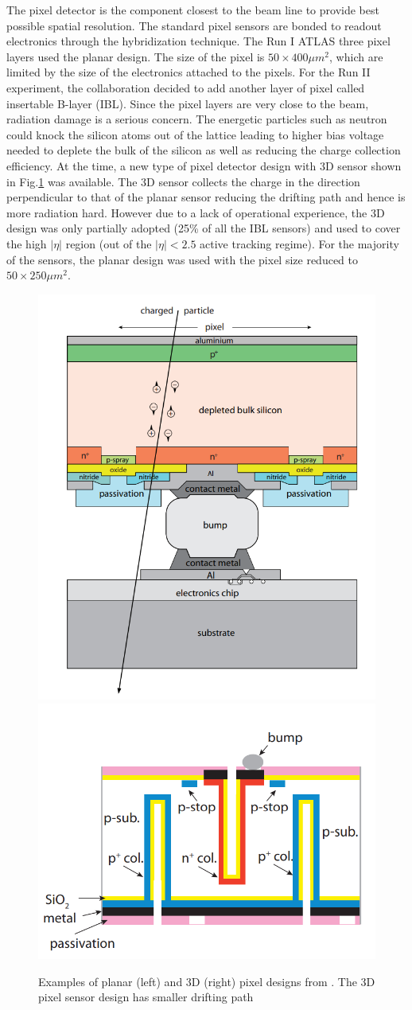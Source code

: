 The pixel detector is the component closest to the beam line to provide best possible spatial resolution. The standard pixel sensors are bonded to readout electronics through the hybridization technique. The Run I ATLAS three pixel layers used the planar design. The size of the pixel is $50\times 400 \mu m^2$, which are limited by the size of the electronics attached to the pixels. For the Run II experiment, the collaboration decided to add another layer of pixel called insertable B-layer (IBL). Since the pixel layers are very close to the beam, radiation damage is a serious concern. The energetic particles such as neutron could knock the silicon atoms out of the lattice leading to higher bias voltage needed to deplete the bulk of the silicon as well as reducing the charge collection efficiency. At the time, a new type of pixel detector design with 3D sensor shown in Fig.\ref{fig:detector-sensor} was available. The 3D sensor collects the charge in the direction perpendicular to that of the planar sensor reducing the drifting path and hence is more radiation hard. However due to a lack of operational experience, the 3D design was only partially adopted (25\% of all the IBL sensors) and used to cover the high $|\eta|$ region (out of the $|\eta|<2.5$ active tracking regime). For the majority of the sensors, the planar design was used with the pixel size reduced to $50\times 250\mu m^2$. 

\begin{figure}[htpb!]
\begin{center}
  \includegraphics[width=0.35\linewidth]{figures/detector/PixelPlanar}
  \includegraphics[width=0.40\linewidth]{figures/detector/Pixel3D}
\caption{Examples of planar (left) and 3D (right) pixel designs from \cite{PixReview}. The 3D pixel sensor design has smaller drifting path }
\label{fig:detector-sensor}
\end{center}
\end{figure}



